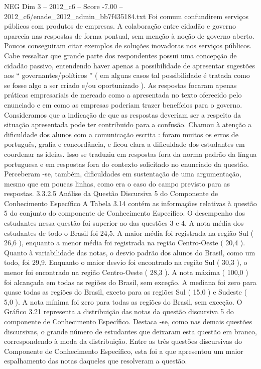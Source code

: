 \begin{textsample}{NEG Dim 3 – 2012\_c6 – Score -7.00 – 2012\_c6/enade\_2012\_admin\_bb7f435184.txt}
Foi comum confundirem serviços públicos com produtos de empresas.
A colaboração entre cidadão e governo aparecia nas respostas de forma pontual, sem menção à noção de governo aberto.
Poucos conseguiram citar exemplos de soluções inovadoras nos serviços públicos.
Cabe ressaltar que grande parte dos respondentes possui uma concepção de cidadão passivo, entendendo haver apenas a possibilidade de apresentar sugestões aos “ governantes/políticos ” ( em alguns casos tal possibilidade é tratada como se fosse algo a ser criado e/ou oportunizado ).
As respostas focaram apenas práticas empresariais de mercado como a apresentada no texto oferecido pelo enunciado e em como as empresas poderiam trazer benefícios para o governo.
Consideramos que a indicação de que as respostas deveriam ser a respeito da situação apresentada pode ter contribuido para a confusão.
Chamou à atenção a dificuldade dos alunos com a comunicação escrita : foram muitos os erros de português, grafia e concordância, e ficou clara a dificuldade dos estudantes em coordenar as ideias.
Isso se traduziu em respostas fora da norma padrão da língua portuguesa e em respostas fora do contexto solicitado no enunciado da questão.
Perceberam -se, também, dificuldades em sustentação de uma argumentação, mesmo que em poucas linhas, como era o caso do campo previsto para as respostas. 3.3.2.5 Análise da Questão Discursiva 5 do Componente de Conhecimento Específico A Tabela 3.14 contém as informações relativas à questão 5 do conjunto do componente de Conhecimento Específico.
O desempenho dos estudantes nessa questão foi superior ao das questões 3 e 4.
A nota média dos estudantes de todo o Brasil foi 24,5.
A maior média foi registrada na região Sul ( 26,6 ), enquanto a menor média foi registrada na região Centro-Oeste ( 20,4 ).
Quanto à variabilidade das notas, o desvio padrão dos alunos do Brasil, como um todo, foi 29,9.
Enquanto o maior desvio foi encontrado na região Sul ( 30,3 ), o menor foi encontrado na região Centro-Oeste ( 28,3 ).
A nota máxima ( 100,0 ) foi alcançada em todas as regiões do Brasil, sem exceção.
A mediana foi zero para quase todas as regiões do Brasil, exceto para as regiões Sul ( 15,0 ) e Sudeste ( 5,0 ).
A nota mínima foi zero para todas as regiões do Brasil, sem exceção.
O Gráfico 3.21 representa a distribuição das notas da questão discursiva 5 do componente de Conhecimento Específico.
Destaca -se, como nas demais questões discursivas, o grande número de estudantes que deixaram esta questão em branco, correspondendo à moda da distribuição.
Entre as três questões discursivas do Componente de Conhecimento Específico, esta foi a que apresentou um maior espalhamento das notas daqueles que resolveram a questão.

\end{textsample}
